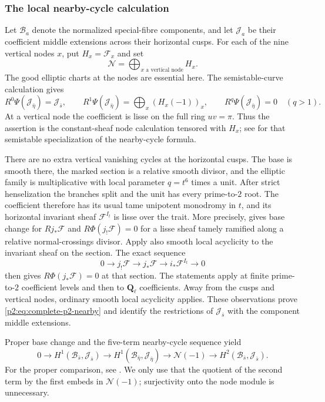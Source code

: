 \subsubsection{The local nearby-cycle calculation}

Let $\mathcal B_a$ denote the normalized special-fibre components, and
let $\mathcal J_a$ be their coefficient middle extensions across their
horizontal cusps. For each of the nine vertical nodes $x$, put
$H_x=\mathcal F_x$ and set
\[
 \mathcal N=\bigoplus_{x\text{ a vertical node}}H_x.
\]
The good elliptic charts at the nodes are essential here. The
semistable-curve calculation gives
\begin{equation}\label{p2:eq:complete-p2-nearby}
 R^0\Psi(\mathcal J_{\bar\eta})=\mathcal J_{\bar s},\qquad
 R^1\Psi(\mathcal J_{\bar\eta})
     =\bigoplus_x(H_x(-1))_x,\qquad
 R^q\Psi(\mathcal J_{\bar\eta})=0\quad(q>1).
\end{equation}
At a vertical node the coefficient is lisse on the full ring
$uv=\pi$. Thus the assertion is the constant-sheaf node calculation
tensored with $H_x$; see \cite[Corollary~8.4.4]{Illusie} for that
semistable specialization of the nearby-cycle formula.

There are no extra vertical vanishing cycles at the horizontal cusps.
The base is smooth there, the marked section is a relative smooth
divisor, and the elliptic family is multiplicative with local parameter
$q=t^6$ times a unit. After strict henselization the branches split and
the unit has every prime-to-$2$ root. The coefficient therefore has its
usual tame unipotent monodromy in $t$, and its horizontal invariant
sheaf $\mathcal F^{I_t}$ is lisse over the trait.
More precisely, \cite[Expose~XIII, Lemmas~2.1.10--2.1.11]{SGA7}
gives base change for $Rj_*\mathcal F$ and
$R\Phi(j_!\mathcal F)=0$ for a lisse sheaf tamely ramified along a
relative normal-crossings divisor. Apply also smooth local acyclicity
to the invariant sheaf on the section. The exact sequence
\[
 0\longrightarrow j_!\mathcal F\longrightarrow j_*\mathcal F
 \longrightarrow i_*\mathcal F^{I_t}\longrightarrow0
\]
then gives $R\Phi(j_*\mathcal F)=0$ at that section. The statements
apply at finite prime-to-$2$ coefficient levels and then to
$\mathbf Q_\ell$ coefficients. Away from the cusps and vertical nodes,
ordinary smooth local acyclicity applies. These observations prove
\eqref{p2:eq:complete-p2-nearby} and identify the restrictions of
$\mathcal J_{\bar s}$ with the component middle extensions.

Proper base change and the five-term nearby-cycle sequence yield
\begin{equation}\label{p2:eq:complete-p2-five-term}
 0\longrightarrow H^1(\mathcal B_{\bar s},\mathcal J_{\bar s})
 \longrightarrow H^1(\mathcal B_{\bar\eta},\mathcal J_{\bar\eta})
 \longrightarrow\mathcal N(-1)
 \longrightarrow H^2(\mathcal B_{\bar s},\mathcal J_{\bar s}).
\end{equation}
For the proper comparison, see
\cite[Expose~XIII, \S2.1.8, especially (2.1.8.9)]{SGA7}.
We only use that the quotient of the second term by the first embeds
in $\mathcal N(-1)$; surjectivity onto the node module is unnecessary.

